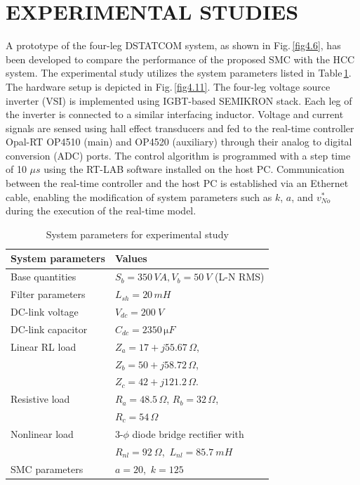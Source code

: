 \section{EXPERIMENTAL STUDIES}
A prototype of the four-leg DSTATCOM system, as shown in Fig.\,\ref{fig4.6}, has been developed to compare the performance of the proposed SMC with the HCC system. The experimental study utilizes the system parameters listed in Table\,\ref{Table4.4}. The hardware setup is depicted in Fig.\,\ref{fig4.11}. The four-leg voltage source inverter (VSI) is implemented using IGBT-based SEMIKRON stack. Each leg of the inverter is connected to a similar interfacing inductor. Voltage and current signals are sensed using hall effect transducers and fed to the real-time controller Opal-RT OP4510 (main) and OP4520 (auxiliary) through their analog to digital conversion (ADC) ports. The control algorithm is programmed with a step time of 10 $\mu s$ using the RT-LAB software installed on the host PC. Communication between the real-time controller and the host PC is established via an Ethernet cable, enabling the modification of system parameters such as $k$, $a$, and $v^{*}_{No}$ during the execution of the real-time model.
\begin{table} 
	\centering
	\caption{System parameters for experimental study} 
	\label{Table4.4}
	\begin{tabular}{>{\small}l>{\small}l}  
		\hline
		\hline
		\textbf{\footnotesize System parameters} & \textbf{\footnotesize Values}\\
		\hline
		\footnotesize Base quantities & \footnotesize$S_{b} = 350\, \si{VA}, V_{b} = 50 ~\si{V}$ (L-N RMS)  \\
		\footnotesize Filter parameters & \footnotesize $L_{sh} = 20 \,\si{mH}$ \\ 
		\footnotesize DC-link voltage & \footnotesize $V_{dc} = 200 ~\si{V}$ \\
		\footnotesize DC-link capacitor & \footnotesize $C_{dc} = 2350 \, \si{\micro F	}$ \\
		\footnotesize Linear RL load  &  \footnotesize $Z_{a} = 17+j55.67\,\si{\Omega}$, \\ & \footnotesize $Z_{b} = 50+j58.72\, \si{\Omega}$, \\  & \footnotesize $Z_{c} = 42+j121.2\, \si{\Omega}$. \\
		\footnotesize Resistive load  &  \footnotesize $R_{a} = 48.5\,\si{\Omega}$, \footnotesize $R_{b} = 32\, \si{\Omega}$, \\  & \footnotesize $R_{c} = 54\, \si{\Omega}$ \\
		\footnotesize Nonlinear load  &  \footnotesize $3$-$\phi$ diode bridge rectifier with \\ & \footnotesize $R_{nl} = 92  ~\Omega$,\, $L_{nl} = 85.7 ~\si{mH}$ \\ 
		\footnotesize SMC parameters  &  \footnotesize $a = 20 $,\, $k = 125 $ \\
		\hline
		\hline 
	\end{tabular} 
\end{table}
